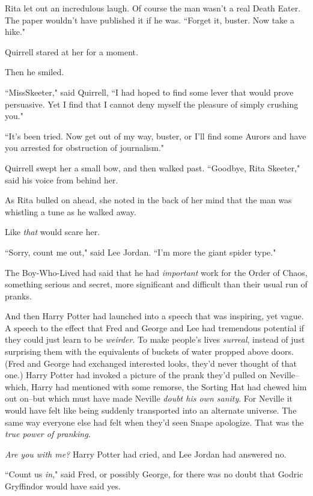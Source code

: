 Rita let out an incredulous laugh. Of course the man wasn't a real Death Eater. The paper wouldn't have published it if he was. ``Forget it, buster. Now take a hike."

Quirrell stared at her for a moment.

Then he smiled.

``Miss\?Skeeter," said Quirrell, ``I had hoped to find some lever that would prove persuasive. Yet I find that I cannot deny myself the pleasure of simply crushing you."

``It's been tried. Now get out of my way, buster, or I'll find some Aurors and have you arrested for obstruction of journalism."

Quirrell swept her a small bow, and then walked past. ``Goodbye, Rita Skeeter," said his voice from behind her.

As Rita bulled on ahead, she noted in the back of her mind that the man was whistling a tune as he walked away.

Like \emph{that} would scare her.


``Sorry, count me out," said Lee Jordan. ``I'm more the giant spider type."

The Boy-Who-Lived had said that he had \emph{important} work for the Order of Chaos, something serious and secret, more significant and difficult than their usual run of pranks.

And then Harry Potter had launched into a speech that was inspiring, yet vague. A speech to the effect that Fred and George and Lee had tremendous potential if they could just learn to be \emph{weirder}. To make people's lives \emph{surreal}, instead of just surprising them with the equivalents of buckets of water propped above doors. (Fred and George had exchanged interested looks, they'd never thought of that one.) Harry Potter had invoked a picture of the prank they'd pulled on Neville\---which, Harry had mentioned with some remorse, the Sorting Hat had chewed him out on\---but which must have made Neville \emph{doubt his own sanity}. For Neville it would have felt like being suddenly transported into an alternate universe. The same way everyone else had felt when they'd seen Snape apologize. That was the \emph{true power of pranking}.

\emph{Are you with me?} Harry Potter had cried, and Lee Jordan had answered no.

``Count us \emph{in}," said Fred, or possibly George, for there was no doubt that Godric Gryffindor would have said yes.


